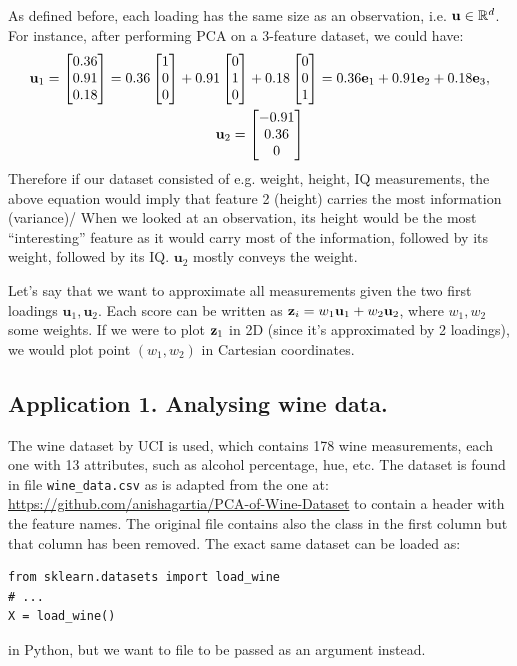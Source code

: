 \documentclass[a4paper]{article}
\begin{document}
As defined before, each loading has the same size as an observation, i.e. $\textbf{u}\in \mathbb{R}^{d}$. For instance, after performing PCA on a 3-feature dataset, we could have:
\begin{gather*}
\textbf{u}_1 = \begin{bmatrix}
0.36  \\ 0.91  \\ 0.18
\end{bmatrix} = 
0.36\begin{bmatrix}
1 \\ 0 \\ 0
\end{bmatrix} +
0.91\begin{bmatrix}
0 \\ 1 \\ 0
\end{bmatrix}+
0.18\begin{bmatrix}
0 \\ 0 \\ 1
\end{bmatrix} = 0.36\textbf{e}_1+0.91\textbf{e}_2+0.18\textbf{e}_3, \\
\textbf{u}_2 = \begin{bmatrix}
  -0.91 \\  0.36  \\ 0
\end{bmatrix}
\end{gather*}
Therefore if our dataset consisted of e.g. weight, height, IQ measurements, the above equation would imply that feature 2 (height) carries the most information (variance)/ When we looked at an observation, its height would be the most ``interesting'' feature as it would carry most of the information, followed by its weight, followed by its IQ. $\textbf{u}_2$ mostly conveys the weight.

Let's say that we want to approximate all measurements given the two first loadings $\textbf{u}_1,\textbf{u}_2$. Each score can be written as $\textbf{z}_i = w_1\textbf{u}_1 + w_2\textbf{u}_2$, where $w_1,w_2$ some weights. If we were to plot $\textbf{z}_1$ in 2D (since it's approximated by 2 loadings), we would plot point $(w_1,w_2)$ in Cartesian coordinates.

\subsection{Application 1. Analysing wine data.}

The wine dataset by UCI is used, which contains 178 wine measurements, each one with 13 attributes, such as alcohol percentage, hue, etc. The dataset is found in file \texttt{wine\_data.csv} as is adapted from the one at: \url{https://github.com/anishagartia/PCA-of-Wine-Dataset} to contain a header with the feature names. The original file contains also the class in the first column but that column has been removed. The exact same dataset can be loaded as:
\begin{verbatim}
from sklearn.datasets import load_wine
# ...
X = load_wine()
\end{verbatim}
in Python, but we want to file to be passed as an argument instead.
\end{document}
